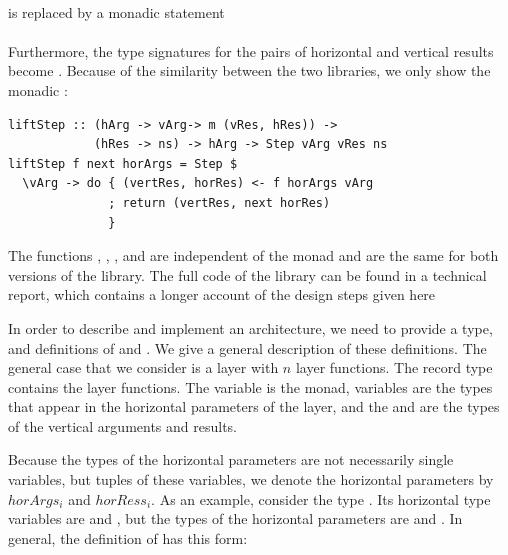 \documentclass{llncs}
\begin{document}
\noindent
{}\\

is replaced by a monadic statement\\

\noindent
{}\\

Furthermore, the type signatures for the pairs of horizontal and vertical results  become . Because of the similarity between the two libraries, we only show the monadic :

\begin{small}
\begin{verbatim}
liftStep :: (hArg -> vArg-> m (vRes, hRes)) -> 
            (hRes -> ns) -> hArg -> Step vArg vRes ns
liftStep f next horArgs = Step $ 
  \vArg -> do { (vertRes, horRes) <- f horArgs vArg
              ; return (vertRes, next horRes)
              }
\end{verbatim}
\end{small}%

The functions , , , and  are independent of the monad and are the same for both versions of the library. The full code of the library can be found in a technical report, which contains a longer account of the design steps given here~\cite{UUCS2008045}

In order to describe and implement an architecture, we need to provide a  type, and definitions of  and . We give a general description of these definitions.
The general case that we consider is a layer with $n$ layer functions. The record type  contains the layer functions. The variable  is the monad, variables  are the types that appear in the horizontal parameters of the layer, and the  and  are the types of the vertical arguments and results. 

Because the types of the horizontal parameters are not necessarily single  variables, but tuples of these variables, we denote the horizontal parameters by $horArgs_i$ and $horRess_i$. As an example, consider the type . Its horizontal  type variables are  and , but the types of the horizontal parameters are  and . In general, the definition of  has this form:
\end{document}
